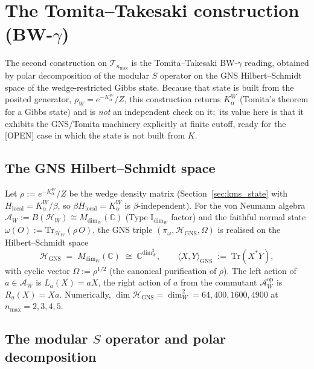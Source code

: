 \documentclass[11pt,a4paper]{article}
\theoremstyle{plain}
\theoremstyle{definition}
\newcommand{\nmax}{n_{\max}}
\newcommand{\Hilb}{\mathcal{H}}
\newcommand{\Tcal}{\mathcal{T}}
\newcommand{\Acal}{\mathcal{A}}
\newcommand{\C}{\mathbb{C}}
\newcommand{\Tr}{\mathrm{Tr}}
\newcommand{\GNS}{\mathrm{GNS}}
\begin{document}
\section{The Tomita--Takesaki construction (BW-$\gamma$)}
\label{sec:tt_construction}

The second construction on $\Tcal_{\nmax}$ is the Tomita--Takesaki
BW-$\gamma$ reading, obtained by polar decomposition of the modular $S$
operator on the GNS Hilbert--Schmidt space of the wedge-restricted
Gibbs state.  Because that state is built from the posited generator,
$\rho_W = e^{-K_\alpha^W}/Z$, this construction returns $K_\alpha^W$
(Tomita's theorem for a Gibbs state) and is \emph{not} an independent
check on it;\ its value here is that it exhibits the GNS/Tomita
machinery explicitly at finite cutoff, ready for the [OPEN] case in
which the state is not built from $K$.

\subsection{The GNS Hilbert--Schmidt space}\label{sec:gns}

Let $\rho := e^{-K_\alpha^W}/Z$ be the wedge density matrix
(Section~\ref{sec:kms_state} with $H_{\mathrm{local}} = K_\alpha^W /
\beta$, so $\beta H_{\mathrm{local}} = K_\alpha^W$ is
$\beta$-independent). For the von Neumann algebra
$\Acal_W := B(\Hilb_W) \cong M_{\dim_W}(\C)$ (Type I$_{\dim_W}$
factor) and the faithful normal state
$\omega(O) := \Tr_{\Hilb_W}(\rho \, O)$, the GNS triple
$(\pi_\omega, \Hilb_{\GNS}, \Omega)$ is realised on the
Hilbert--Schmidt space
\begin{equation}\label{eq:H_GNS_def}
   \Hilb_{\GNS}
   \;=\; M_{\dim_W}(\C)
   \;\cong\; \C^{\dim_W^2},
   \qquad
   \langle X, Y \rangle_{\GNS} \;:=\; \Tr(X^* Y),
\end{equation}
with cyclic vector $\Omega := \rho^{1/2}$ (the canonical purification
of $\rho$). The left action of $a \in \Acal_W$ is $L_a(X) = a X$, the
right action of $a$ from the commutant $\Acal_W^{\mathrm{op}}$ is
$R_a(X) = X a$. Numerically, $\dim \Hilb_{\GNS} = \dim_W^2 = 64, 400,
1600, 4900$ at $\nmax = 2, 3, 4, 5$.

\subsection{The modular $S$ operator and polar decomposition}
\label{sec:S_polar}
\end{document}
